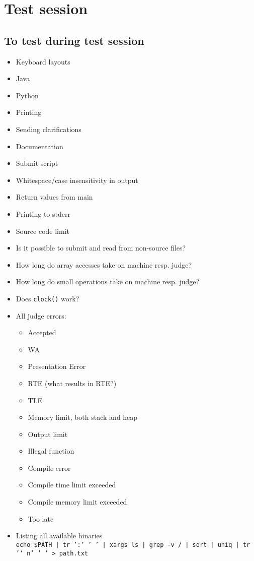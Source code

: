 \appendix
\chapter{Test session}

\section{To test during test session}
\begin{itemize}
	\item Keyboard layouts
	\item Java
	\item Python
	\item Printing
	\item Sending clarifications
	\item Documentation
	\item Submit script
	\item Whitespace/case insensitivity in output
	\item Return values from main
	\item Printing to stderr
	\item Source code limit
	\item Is it possible to submit and read from non-source files?
	\item How long do array accesses take on machine resp. judge?
	\item How long do small operations take on machine resp. judge?
	\item Does \texttt{clock()} work?
	\item All judge errors:
		\begin{itemize}
			\item Accepted
			\item WA
			\item Presentation Error
			\item RTE (what results in RTE?)
			\item TLE
			\item Memory limit, both stack and heap
			\item Output limit
			\item Illegal function
			\item Compile error
			\item Compile time limit exceeded
			\item Compile memory limit exceeded
			\item Too late
		\end{itemize}
	\item Listing all available binaries\\
		\texttt{echo \$PATH | tr ':' ' ' | xargs ls | grep -v / | sort | uniq | tr '\char`\\n' ' ' > path.txt}
\end{itemize}
